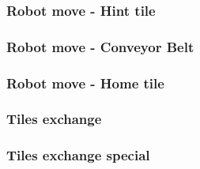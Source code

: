 	\subsubsection{Robot move - Hint tile}
	
	
	\subsubsection{Robot move - Conveyor Belt}
	
	
	\subsubsection{Robot move - Home tile}
	
	
	\subsubsection{Tiles exchange}
	
	
	\subsubsection{Tiles exchange special}
	
	
